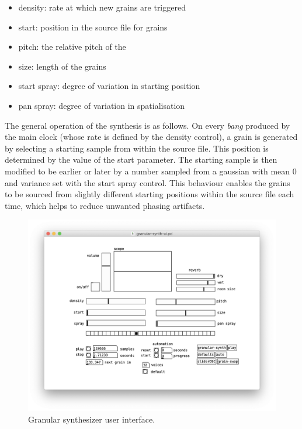 \documentclass{nime-alternate}
\begin{document}
\begin{itemize}
	\item density: rate at which new grains are triggered
	\item start: position in the source file for grains
	\item pitch: the relative pitch of the 
	\item size: length of the grains
	\item start spray: degree of variation in starting position
	\item pan spray: degree of variation in spatialisation
\end{itemize}

The general operation of the synthesis is as follows. 
On every \emph{bang} produced by the main clock (whose rate is defined
by the density control), a grain is generated by selecting a starting sample 
from within the source file. This position is determined by the value of the 
start parameter. The starting sample is then modified to be earlier or later
by a number sampled from a gaussian with mean 0 and variance set with the start spray control.
This behaviour enables the grains to be sourced from slightly different starting positions
within the source file each time, which helps to reduce unwanted phasing artifacts.

\begin{figure}[h] \label{fig:engine}
	\includegraphics[width=\linewidth]{../img/engine.png}
	\caption{Granular synthesizer user interface.}
	\centering
\end{figure}
\end{document}
